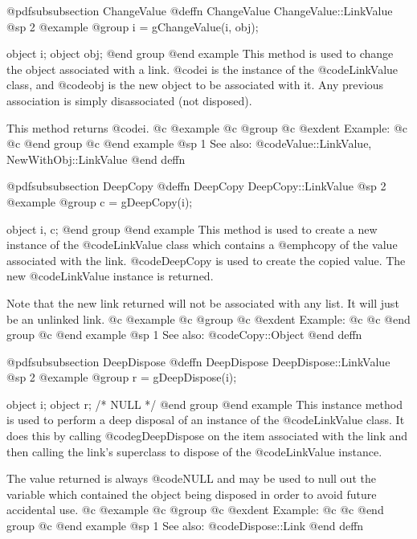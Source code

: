 @pdfsubsubsection {ChangeValue}
@deffn {ChangeValue} ChangeValue::LinkValue
@sp 2
@example
@group
i = gChangeValue(i, obj);

object  i;
object  obj;
@end group
@end example
This method is used to change the object associated with a link.
@code{i} is the instance of the @code{LinkValue} class, and
@code{obj} is the new object to be associated with it.
Any previous association is simply disassociated (not disposed).

This method returns @code{i}.
@c @example
@c @group
@c @exdent Example:
@c 
@c @end group
@c @end example
@sp 1
See also:  @code{Value::LinkValue, NewWithObj::LinkValue}
@end deffn











@pdfsubsubsection {DeepCopy}
@deffn {DeepCopy} DeepCopy::LinkValue
@sp 2
@example
@group
c = gDeepCopy(i);

object  i, c;
@end group
@end example
This method is used to create a new instance of the @code{LinkValue} class
which contains a @emph{copy} of the value associated with the link.
@code{DeepCopy} is used to create the copied value.
The new @code{LinkValue} instance is returned.

Note that the new link returned will not be associated with any list.
It will just be an unlinked link.
@c @example
@c @group
@c @exdent Example:
@c 
@c @end group
@c @end example
@sp 1
See also:  @code{Copy::Object}
@end deffn











@pdfsubsubsection {DeepDispose}
@deffn {DeepDispose} DeepDispose::LinkValue
@sp 2
@example
@group
r = gDeepDispose(i);

object  i;
object  r;     /*  NULL  */
@end group
@end example
This instance method is used to perform a deep disposal of an instance
of the @code{LinkValue} class.  It does this by calling @code{gDeepDispose}
on the item associated with the link and then calling the link's
superclass to dispose of the @code{LinkValue} instance.

The value returned is always @code{NULL} and may be used to null out
the variable which contained the object being disposed in order to
avoid future accidental use.
@c @example
@c @group
@c @exdent Example:
@c 
@c @end group
@c @end example
@sp 1
See also:  @code{Dispose::Link}
@end deffn








